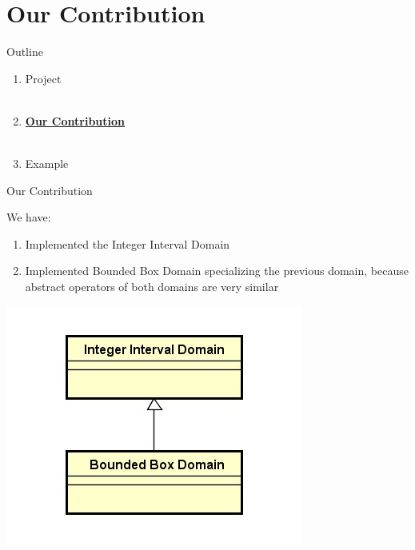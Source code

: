 \documentclass{beamer}
\begin{document}
	\section{Our Contribution}
	\begin{frame}{Outline}
\Large
		\begin{enumerate}
			\item Project \\~\\
			\item \textbf{\underline{Our Contribution}} \\~\\
			\item Example

		\end{enumerate}
	\end{frame}
\normalsize
	\begin{frame}{Our Contribution}

	We have:\\
	\begin{enumerate}
		\item Implemented the Integer Interval Domain
		\item Implemented Bounded Box Domain specializing the previous domain, because abstract operators of both domains are very similar
	\end{enumerate}
\centering
		\includegraphics[scale=0.4]{images/gerarchia.jpg}\\
	
	\end{frame}
\end{document}
